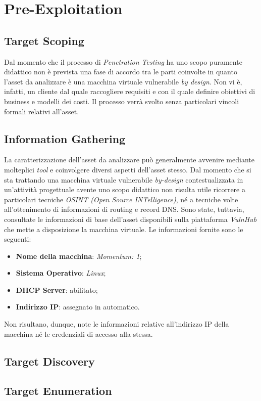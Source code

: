 
\chapter{Pre-Exploitation}

\begin{citazione}
\end{citazione}
\newpage

\section{Target Scoping} { }
Dal momento che il processo di \emph{Penetration Testing} ha uno scopo puramente didattico non è prevista una fase di accordo tra le parti coinvolte in quanto l'asset da analizzare è una macchina virtuale vulnerabile \emph{by design}. Non vi è, infatti, un cliente dal quale raccogliere requisiti e con il quale definire obiettivi di business e modelli dei costi. Il processo verrà svolto senza particolari vincoli formali relativi all'asset.

\section{Information Gathering} { }
La caratterizzazione dell'asset da analizzare può generalmente avvenire mediante molteplici \emph{tool} e coinvolgere diversi aspetti dell'asset stesso. Dal momento che si sta trattando una macchina virtuale vulnerabile \emph{by-design} contestualizzata in un'attività progettuale avente uno scopo didattico non risulta utile ricorrere a particolari tecniche \emph{OSINT (Open Source INTelligence)}, né a tecniche volte all'ottenimento di informazioni di routing e record DNS. Sono state, tuttavia, consultate le informazioni di base dell'asset disponibili sulla piattaforma \emph{VulnHub} che mette a disposizione la macchina virtuale. Le informazioni fornite sono le seguenti:
\begin{itemize}
    \item \textbf{Nome della macchina}: \emph{Momentum: 1};
    \item \textbf{Sistema Operativo}: \emph{Linux};
    \item \textbf{DHCP Server}: abilitato;
    \item \textbf{Indirizzo IP}: assegnato in automatico.
\end{itemize}
Non risultano, dunque, note le informazioni relative all'indirizzo IP della macchina né le credenziali di accesso alla stessa. 
\section{Target Discovery} { }

\section{Target Enumeration} { }

\section{}